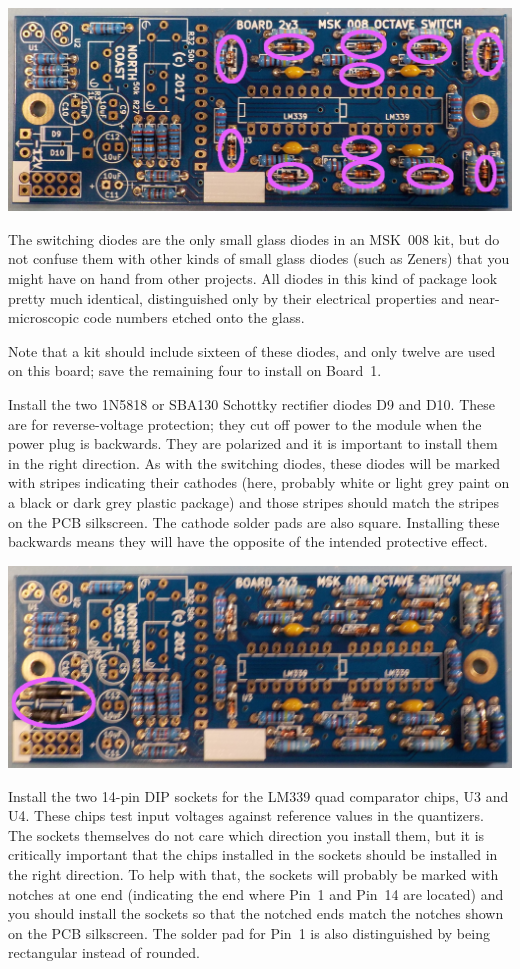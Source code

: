 \noindent\includegraphics[width=\linewidth]{diodes2.jpg}

The switching diodes are the only small glass diodes in an MSK~008 kit, but
do not confuse them with other kinds of small glass diodes (such as Zeners)
that you might have on hand from other projects.  All diodes in this kind of
package look pretty much identical, distinguished only by their electrical
properties and near-microscopic code numbers etched onto the glass.

Note that a kit should include sixteen of these diodes, and only twelve are
used on this board; save the remaining four to install on Board~1.

Install the two 1N5818 or SBA130 Schottky rectifier diodes D9 and D10. 
These are for reverse-voltage protection; they cut off power to the module
when the power plug is backwards.  They are polarized and it is important to
install them in the right direction.  As with the switching diodes, these
diodes will be marked with stripes indicating their cathodes (here, probably
white or light grey paint on a black or dark grey plastic package) and those
stripes should match the stripes on the PCB silkscreen.  The cathode solder
pads are also square.  Installing these backwards means they will have the
opposite of the intended protective effect.

\noindent\includegraphics[width=\linewidth]{schottky.jpg}

Install the two 14-pin DIP sockets for the LM339 quad comparator chips, U3
and U4.  These chips test input voltages against reference values in the
quantizers.  The sockets themselves do not care which direction you install
them, but it is critically important that the chips installed in the sockets
should be installed in the right direction.  To help with that, the sockets
will probably be marked with notches at one end (indicating the end where
Pin~1 and Pin~14 are located) and you should install the sockets so that the
notched ends match the notches shown on the PCB silkscreen.  The solder pad
for Pin~1 is also distinguished by being rectangular instead of rounded.

